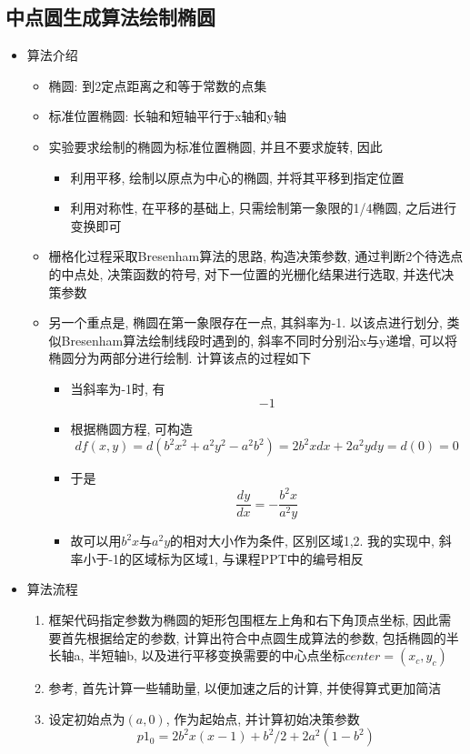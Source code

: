 \documentclass[a4paper,UTF8]{article}
\theoremstyle{definition}
\begin{document}
\subsection{中点圆生成算法绘制椭圆}
\begin{itemize}
  \item 算法介绍\begin{itemize}
    \item 椭圆: 到2定点距离之和等于常数的点集
    \item 标准位置椭圆: 长轴和短轴平行于x轴和y轴
    \item 实验要求绘制的椭圆为标准位置椭圆, 并且不要求旋转, 因此\begin{itemize}
      \item 利用平移, 绘制以原点为中心的椭圆, 并将其平移到指定位置
      \item 利用对称性, 在平移的基础上, 只需绘制第一象限的1/4椭圆, 之后进行变换即可
    \end{itemize}
    \item 栅格化过程采取Bresenham算法的思路, 构造决策参数, 通过判断2个待选点的中点处, 决策函数的符号, 对下一位置的光栅化结果进行选取, 并迭代决策参数
    \item 另一个重点是, 椭圆在第一象限存在一点, 其斜率为-1. 以该点进行划分, 类似Bresenham算法绘制线段时遇到的, 斜率不同时分别沿x与y递增, 可以将椭圆分为两部分进行绘制\cite{sun_2006}. 计算该点的过程如下\begin{itemize}
      \item 当斜率为-1时, 有$$ -1$$
      \item 根据椭圆方程, 可构造$$df(x,y) = d(b^2x^2 + a^2y^2-a^2b^2) = 2b^2xdx + 2a^2ydy = d(0)  = 0$$
      \item 于是$$\frac{dy}{dx} = -\frac{b^2x}{a^2y}$$
      \item 故可以用$b^2x$与$a^2y$的相对大小作为条件, 区别区域1,2. 我的实现中, 斜率小于-1的区域标为区域1, 与课程PPT中的编号相反
    \end{itemize}
  \end{itemize}
  \item 算法流程
  \begin{enumerate}
    \item 框架代码指定参数为椭圆的矩形包围框左上角和右下角顶点坐标, 因此需要首先根据给定的参数, 计算出符合中点圆生成算法的参数, 包括椭圆的半长轴a, 半短轴b, 以及进行平移变换需要的中心点坐标$center = (x_c,y_c)$
    \item 参考\cite{rog_2002}, 首先计算一些辅助量, 以便加速之后的计算, 并使得算式更加简洁
    \item 设定初始点为$(a,0)$, 作为起始点, 并计算初始决策参数$$p1_0 = 2b^2x(x-1)+b^2/2+2a^2(1-b^2)$$

\end{enumerate}
\end{itemize}
\end{document}
